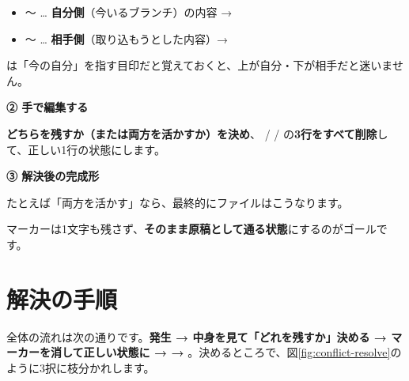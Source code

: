 \begin{itemize}[leftmargin=1.4em]
  \item {} 〜 \cmd{=======} … \textbf{自分側}（今いるブランチ）の内容 → 
  \item \cmd{=======} 〜  … \textbf{相手側}（取り込もうとした内容）→ 
\end{itemize}

 は「今の自分」を指す目印だと覚えておくと、上が自分・下が相手だと迷いません。

\noindent\textbf{② 手で編集する}

\textbf{どちらを残すか（または両方を活かすか）を決め}、\cmd{<<<<<<<} / \cmd{=======} / \cmd{>>>>>>>} の\textbf{3行をすべて削除}して、正しい1行の状態にします。

\noindent\textbf{③ 解決後の完成形}

たとえば「両方を活かす」なら、最終的にファイルはこうなります。

\begin{codebox}[text]
\begin{code}
\author{山田, 佐藤, 鈴木, 田中}
\end{code}
\end{codebox}

マーカーは1文字も残さず、\textbf{そのまま原稿として通る状態}にするのがゴールです。

\section{解決の手順}

全体の流れは次の通りです。\textbf{発生 → 中身を見て「どれを残すか」決める → マーカーを消して正しい状態に →  → }。決めるところで、図\ref{fig:conflict-resolve}のように3択に枝分かれします。

